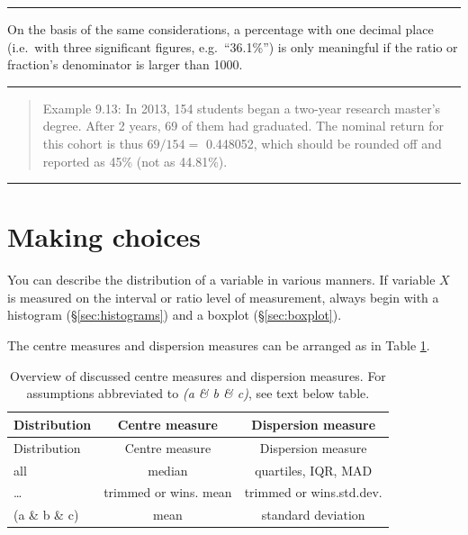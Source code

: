 \documentclass[
]{book}
\begin{document}
\begin{center}\rule{0.5\linewidth}{0.5pt}\end{center}

On the basis of the same considerations, a percentage with one decimal
place (i.e.~with three significant figures, e.g.~``36.1\%'') is only
meaningful if the ratio or fraction's denominator is larger than 1000.

\begin{center}\rule{0.5\linewidth}{0.5pt}\end{center}

\begin{quote}
Example 9.13:
In 2013, 154 students began a two-year research master's degree. After
2 years, 69 of them had graduated. The nominal return for this cohort is
thus \(69/154=\) 0.448052, which should be rounded off and reported as 45\%
(not as 44.81\%).
\end{quote}

\begin{center}\rule{0.5\linewidth}{0.5pt}\end{center}

\hypertarget{sec:robustefficient}{%
\section{Making choices}\label{sec:robustefficient}}

You can describe the distribution of a variable in various
manners.
If variable \(X\) is measured on the interval or ratio level of measurement,
always begin with a histogram (§\ref{sec:histograms})
and a boxplot (§\ref{sec:boxplot}).

The centre measures and dispersion measures can be arranged
as in Table \ref{tab:centredispersionmeasures}.

\begin{longtable}[]{@{}lcc@{}}
\caption{\label{tab:centredispersionmeasures} Overview of discussed centre measures and dispersion measures. For assumptions abbreviated to \emph{(a \& b \& c)}, see text below table.}\tabularnewline
\toprule
Distribution & Centre measure & Dispersion measure \\
\midrule
\endfirsthead
\toprule
Distribution & Centre measure & Dispersion measure \\
\midrule
\endhead
all & median & quartiles, IQR, MAD \\
\ldots{} & trimmed or wins. mean & trimmed or wins.std.dev. \\
(a \& b \& c) & mean & standard deviation \\
\bottomrule
\end{longtable}
\end{document}
